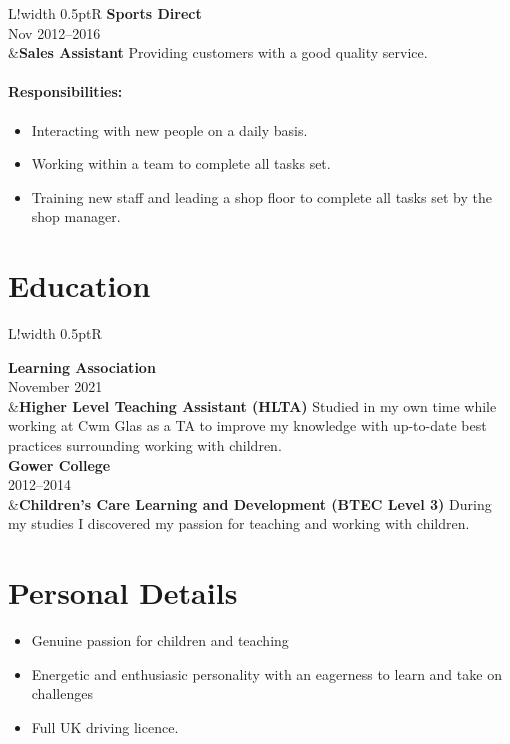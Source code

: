 \documentclass[10pt]{article}
\newcommand\VRule{\color{lightgray}\vrule width 0.5pt}
\begin{document}
\begin{longtable}{L!{\VRule}R}
{\bf Sports Direct}\\
Nov 2012--2016\\
&{\bf Sales Assistant}\newline
Providing customers with a good quality service.

\vspace{-3mm}
\paragraph{Responsibilities:}
\begin{itemize}[noitemsep,topsep=0pt]
    \item Interacting with new people on a daily basis.
    \item Working within a team to complete all tasks set.
    \item Training new staff and leading a shop floor to complete all tasks set by the shop manager.
\end{itemize}
\end{longtable}

\clearpage

\section*{Education}

\begin{longtable}{L!{\VRule}R}

{\bf Learning Association}\\
November 2021\\
    &{\bf Higher Level Teaching Assistant (HLTA)}\newline
Studied in my own time while working at Cwm Glas as a TA to improve my knowledge with up-to-date best practices surrounding working with children.
\\

{\bf Gower College}\\
2012--2014\\
    &{\bf Children's Care Learning and Development (BTEC Level 3)}\newline
During my studies I discovered my passion for teaching and working with children.
\\

\end{longtable}

\section*{Personal Details}
\begin{itemize}[noitemsep,topsep=0pt]
    \item Genuine passion for children and teaching
    \item Energetic and enthusiasic personality with an eagerness to learn and take on challenges
	\item Full UK driving licence.
\end{itemize}
\end{document}

